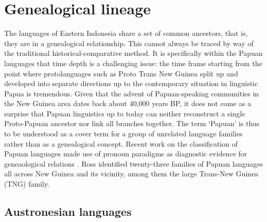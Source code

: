 \section{Genealogical lineage}\label{sec:geneticlineage}

The languages of Eastern Indonesia share a set of common ancestors, that is, they are in a genealogical relationship. This cannot always be traced by way of the traditional historical-comparative method. It is specifically within the Papuan languages that time depth is a challenging issue: the time frame starting from the point where protolanguages such as Proto Trans New Guinea split up and developed into separate directions up to the contemporary situation in linguistic Papua is tremendous. Given that the advent of Papuan-speaking communities in the New Guinea area dates back about 40,000 years BP, it does not come as a surprise that Papuan linguistics up to today can neither reconstruct a single Proto-Papuan ancestor nor link all branches together. The term `Papuan' is thus to be understood as a cover term for a group of unrelated language families rather than as a genealogical concept. Recent work on the classification of Papuan languages made use of pronoun paradigms as diagnostic evidence for geneaological relations \citep{Ross2005}. Ross identified twenty-three families of Papuan languages all across New Guinea and its vicinity, among them the large Trans-New Guinea (TNG) family.

\subsection{Austronesian languages}

